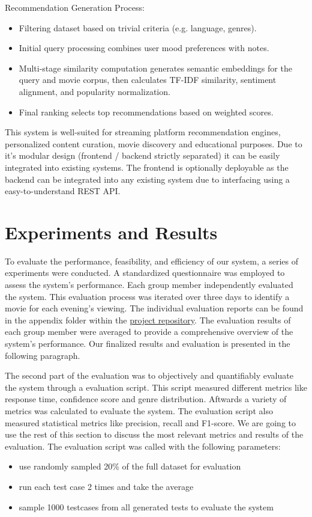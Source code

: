 \documentclass[12pt,a4paper]{article}
\begin{document}
\noindent Recommendation Generation Process:
\begin{itemize}
  \item Filtering dataset based on trivial criteria (e.g. language, genres).
  \item Initial query processing combines user mood preferences with notes.
  \item Multi-stage similarity computation generates semantic embeddings for the query and movie corpus, then calculates TF-IDF similarity, sentiment alignment, and popularity normalization.
  \item Final ranking selects top recommendations based on weighted scores.
\end{itemize}

\noindent This system is well-suited for streaming platform recommendation engines, personalized content curation, movie discovery and educational purposes.
Due to it's modular design (frontend / backend strictly separated) it can be easily integrated into existing systems.
The frontend is optionally deployable as the backend can be integrated into any existing system due to interfacing
using a easy-to-understand REST API.

\section{Experiments and Results}

To evaluate the performance, feasibility, and efficiency of our system, a series of experiments were conducted.
A standardized questionnaire was employed to assess the system’s performance.
Each group member independently evaluated the system.
This evaluation process was iterated over three days to identify a movie for each evening’s viewing.
The individual evaluation reports can be found in the appendix folder within the
\href{https://github.com/IImpaq/air-2024/appendix}{project repository}.
The evaluation results of each group member were averaged to provide a comprehensive overview of the system’s performance.
Our finalized results and evaluation is presented in the following paragraph.


\noindent The second part of the evaluation was to objectively and quantifiably evaluate the system through a evaluation script.
This script measured different metrics like response time, confidence score and genre distribution.
Aftwards a variety of metrics was calculated to evaluate the system.
The evaluation script also measured statistical metrics like precision, recall and F1-score.
We are going to use the rest of this section to discuss the most relevant metrics and results of the evaluation.
The evaluation script was called with the following parameters:
\begin{itemize}
  \item use randomly sampled 20\% of the full dataset for evaluation
  \item run each test case 2 times and take the average
  \item sample 1000 testcases from all generated tests to evaluate the system
\end{itemize}
\end{document}
